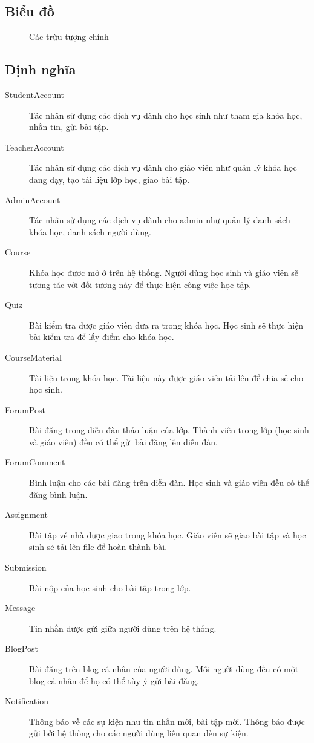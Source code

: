 \documentclass[./../main_file.tex]{subfiles}
\begin{document}
	\subsection{Biểu đồ}
	\begin{figure}[H]
		\centering
		\resizebox{0.8\textwidth}{!}{}
		\caption{Các trừu tượng chính}
	\end{figure}
	\subsection{Định nghĩa}
	\begin{description}
		\item[StudentAccount] Tác nhân sử dụng các dịch vụ dành cho học sinh như tham gia khóa học, nhắn tin, gửi bài tập.
		\item[TeacherAccount] Tác nhân sử dụng các dịch vụ dành cho giáo viên như quản lý khóa học đang dạy, tạo tài liệu lớp học, giao bài tập.
		\item[AdminAccount] Tác nhân sử dụng các dịch vụ dành cho admin như quản lý danh sách khóa học, danh sách người dùng.
		\item[Course] Khóa học được mở ở trên hệ thống. Người dùng học sinh và giáo viên sẽ tương tác với đối tượng này để thực hiện công việc học tập.
		\item[Quiz] Bài kiểm tra được giáo viên đưa ra trong khóa học. Học sinh sẽ thực hiện bài kiểm tra để lấy điểm cho khóa học.
		\item[CourseMaterial] Tài liệu trong khóa học. Tài liệu này được giáo viên tải lên để chia sẻ cho học sinh.
		\item[ForumPost] Bài đăng trong diễn đàn thảo luận của lớp. Thành viên trong lớp (học sinh và giáo viên) đều có thể gửi bài đăng lên diễn đàn.
		\item[ForumComment] Bình luận cho các bài đăng trên diễn đàn. Học sinh và giáo viên đều có thể đăng bình luận.
		\item[Assignment] Bài tập về nhà được giao trong khóa học. Giáo viên sẽ giao bài tập và học sinh sẽ tải lên file để hoàn thành bài.
		\item[Submission] Bài nộp của học sinh cho bài tập trong lớp.
		\item[Message] Tin nhắn được gửi giữa người dùng trên hệ thống.
		\item[BlogPost] Bài đăng trên blog cá nhân của người dùng. Mỗi người dùng đều có một blog cá nhân để họ có thể tùy ý gửi bài đăng.
		\item[Notification] Thông báo về các sự kiện như tin nhắn mới, bài tập mới. Thông báo được gửi bởi hệ thống cho các người dùng liên quan đến sự kiện.
		
	\end{description}
	
\end{document}
